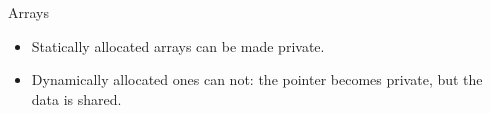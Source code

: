 \begin{numberedframe}{Arrays}
  \begin{itemize}
  \item Statically allocated arrays can be made private.
  \item Dynamically allocated ones can not: the pointer becomes private,
    but the data is shared.
  \end{itemize}
\end{numberedframe}

\endinput

\begin{numberedframe}{}
  \begin{itemize}
  \item 
  \end{itemize}
\end{numberedframe}

